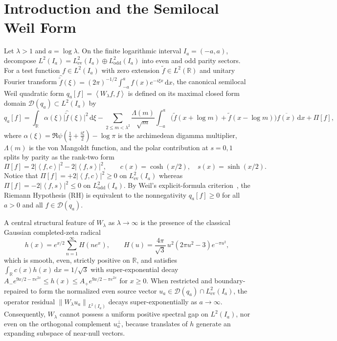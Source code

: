 \documentclass[11pt]{article}
\theoremstyle{remark}
\newcommand{\norm}[1]{\left\lVert #1\right\rVert}
\newcommand{\ip}[2]{\left\langle #1,#2\right\rangle}
\newcommand{\dd}{\mathrm d}
\begin{document}
\tableofcontents

\section{Introduction and the Semilocal Weil Form}
\label{sec:intro}

Let $\lambda > 1$ and $a = \log\lambda$. On the finite logarithmic interval $I_a = (-a,a)$, decompose $L^2(I_a) = L^2_{\mathrm{ev}}(I_a) \oplus L^2_{\mathrm{odd}}(I_a)$ into even and odd parity sectors. For a test function $f \in L^2(I_a)$ with zero extension $\widetilde{f} \in L^2(\mathbb{R})$ and unitary Fourier transform $\widehat{\widetilde{f}}(\xi) = (2\pi)^{-1/2}\int_{-a}^a f(x)e^{-i\xi x}\,\dd x$, the canonical semilocal Weil quadratic form $q_a[f] = \ip{W_\lambda f}{f}$ is defined on its maximal closed form domain $\mathcal{D}(q_a) \subset L^2(I_a)$ by
\begin{equation}\label{eq:weil-form}
  q_a[f] = \int_{\mathbb{R}} \alpha(\xi)\bigl|\widehat{\widetilde{f}}(\xi)\bigr|^2\,\dd\xi - \sum_{2 \le m < \lambda^2} \frac{\Lambda(m)}{\sqrt{m}} \int_{-a}^a \bigl(\widetilde{f}(x + \log m) + \widetilde{f}(x - \log m)\bigr)\overline{f(x)}\,\dd x + \Pi[f],
\end{equation}
where $\alpha(\xi) = \Re\psi\!\left(\tfrac{1}{4} + \tfrac{i\xi}{2}\right) - \log\pi$ is the archimedean digamma multiplier, $\Lambda(m)$ is the von Mangoldt function, and the polar contribution at $s = 0, 1$ splits by parity as the rank-two form
\begin{equation}\label{eq:pole-form}
  \Pi[f] = 2\bigl|\ip{f}{c}\bigr|^2 - 2\bigl|\ip{f}{s}\bigr|^2, \qquad c(x) = \cosh(x/2), \quad s(x) = \sinh(x/2).
\end{equation}
Notice that $\Pi[f] = +2|\ip{f}{c}|^2 \ge 0$ on $L^2_{\mathrm{ev}}(I_a)$ whereas $\Pi[f] = -2|\ip{f}{s}|^2 \le 0$ on $L^2_{\mathrm{odd}}(I_a)$. By Weil's explicit-formula criterion~\cite{ConnesConsani2023,ConnesVanSuijlekom2021}, the Riemann Hypothesis (RH) is equivalent to the nonnegativity $q_a[f] \ge 0$ for all $a > 0$ and all $f \in \mathcal{D}(q_a)$.

A central structural feature of $W_\lambda$ as $\lambda \to \infty$ is the presence of the classical Gaussian completed-zeta radical
\begin{equation}\label{eq:gaussian-radical}
  h(x) = e^{x/2}\sum_{n=1}^\infty H(ne^x), \qquad H(u) = \frac{4\pi}{\sqrt{3}}\,u^2(2\pi u^2 - 3)e^{-\pi u^2},
\end{equation}
which is smooth, even, strictly positive on $\mathbb{R}$, and satisfies $\int_{\mathbb{R}} c(x)h(x)\,\dd x = 1/\sqrt{3}$ with super-exponential decay $A_- e^{9x/2 - \pi e^{2x}} \le h(x) \le A_+ e^{9x/2 - \pi e^{2x}}$ for $x \ge 0$. When restricted and boundary-repaired to form the normalized even source vector $u_a \in \mathcal{D}(q_a) \cap L^2_{\mathrm{ev}}(I_a)$, the operator residual $\norm{W_\lambda u_a}_{L^2(I_a)}$ decays super-exponentially as $a \to \infty$. Consequently, $W_\lambda$ cannot possess a uniform positive spectral gap on $L^2(I_a)$, nor even on the orthogonal complement $u_a^\perp$, because translates of $h$ generate an expanding subspace of near-null vectors.
\end{document}
